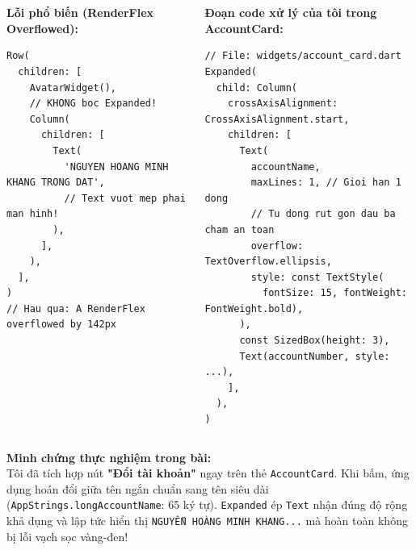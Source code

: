 \documentclass[aspectratio=169, 10pt]{beamer}
\newcommand{\SlideHeader}[2]{%
  \noindent{\textcolor{AccentOrange}{\textbf{\footnotesize #1}}}\\[0.08cm]
  \noindent{\Large \textbf{\textcolor{NavyTitle}{#2}}}\\[0.22cm]
}
\begin{document}
\begin{frame}[fragile]
  \SlideHeader{NHẤN MẠNH GIẢI PHÁP CỦA TÔI}{Trị Dứt Điểm Tràn Ngang Văn Bản: Expanded + Ellipsis}

  \begin{columns}[T]
    \begin{column}{0.48\textwidth}
      \textbf{\textcolor{ErrorRed}{Lỗi phổ biến (RenderFlex Overflowed):}}
\begin{lstlisting}[rulecolor=\color{ErrorRed}]
Row(
  children: [
    AvatarWidget(),
    // KHONG boc Expanded!
    Column(
      children: [
        Text(
          'NGUYEN HOANG MINH KHANG TRONG DAT',
          // Text vuot mep phai man hinh!
        ),
      ],
    ),
  ],
)
// Hau qua: A RenderFlex overflowed by 142px
\end{lstlisting}
    \end{column}

    \begin{column}{0.48\textwidth}
      \textbf{\textcolor{SuccessGreen}{Đoạn code xử lý của tôi trong AccountCard:}}
\begin{lstlisting}[rulecolor=\color{SuccessGreen}]
// File: widgets/account_card.dart
Expanded(
  child: Column(
    crossAxisAlignment: CrossAxisAlignment.start,
    children: [
      Text(
        accountName,
        maxLines: 1, // Gioi han 1 dong
        // Tu dong rut gon dau ba cham an toan
        overflow: TextOverflow.ellipsis,
        style: const TextStyle(
          fontSize: 15, fontWeight: FontWeight.bold),
      ),
      const SizedBox(height: 3),
      Text(accountNumber, style: ...),
    ],
  ),
)
\end{lstlisting}
    \end{column}
  \end{columns}

  \vspace{0.1cm}
  \begin{tcolorbox}[colback=SuccessGreen!5, colframe=SuccessGreen, arc=4pt, boxrule=0.8pt, top=3pt, bottom=3pt]
    {\scriptsize \textbf{Minh chứng thực nghiệm trong bài:}\\
    Tôi đã tích hợp nút \textbf{"Đổi tài khoản"} ngay trên thẻ \texttt{AccountCard}. Khi bấm, ứng dụng hoán đổi giữa tên ngắn chuẩn sang tên siêu dài (\texttt{AppStrings.longAccountName}: 65 ký tự). \texttt{Expanded} ép \texttt{Text} nhận đúng độ rộng khả dụng và lập tức hiển thị \texttt{NGUYỄN HOÀNG MINH KHANG...} mà hoàn toàn không bị lỗi vạch sọc vàng-đen!}
  \end{tcolorbox}
\end{frame}
\end{document}
